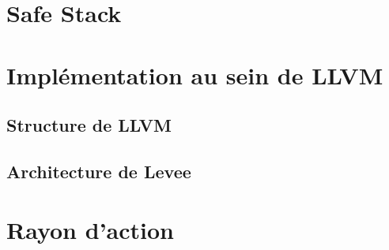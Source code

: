 
\section{Safe Stack}
\label{section:safeStack}


\section{Implémentation au sein de LLVM}

%

\subsection{Structure de LLVM}


\subsection{Architecture de Levee}


\section{Rayon d'action}

